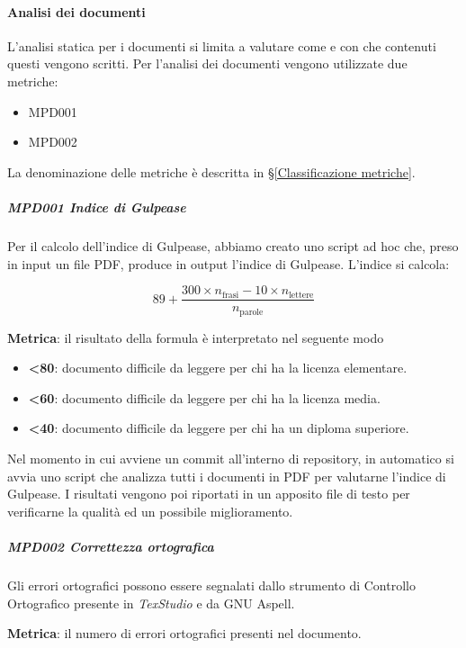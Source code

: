 			\paragraph{Analisi dei documenti}\label{ProcessiSupportoMetriche}
			L'analisi statica per i documenti si limita a valutare come e con che contenuti questi vengono scritti.
			Per l'analisi dei documenti vengono utilizzate due metriche:

			\begin{itemize}
				\item MPD001
				\item MPD002
			\end{itemize}
			
			La denominazione delle metriche è descritta in \S\ref{Classificazione metriche}.

			\subparagraph{MPD001 Indice di Gulpease}\label{AnalisiStatica:Gulpease}
			Per il calcolo dell'indice di Gulpease, abbiamo creato uno script ad hoc che, preso in input un file PDF, produce in output l'indice di Gulpease.
			L'indice si calcola:

			\[89+\dfrac{300\times n_{\text{frasi}}-10\times n_{\text{lettere}}}{n_{\text{parole}}}\]
			
			\textbf{Metrica}: il risultato della formula è interpretato nel seguente modo

			\begin{itemize}
				\item \textbf{<80}: documento  difficile da leggere per chi ha la licenza elementare.
				\item \textbf{<60}: documento  difficile da leggere per chi ha la licenza media.
				\item \textbf{<40}: documento difficile da leggere per chi ha un diploma superiore.
			\end{itemize}

			Nel momento in cui avviene un commit all'interno di repository, in automatico si avvia uno script che analizza tutti i documenti in PDF per valutarne
			l'indice di Gulpease. I risultati vengono poi riportati in un apposito file di testo per verificarne la qualità ed un possibile miglioramento.

			\subparagraph{MPD002 Correttezza ortografica}\label{AnalisiStatica:CorrettezzaOrtografica}
			Gli errori ortografici possono essere segnalati dallo strumento di Controllo Ortografico presente in \textit{TexStudio} e da GNU Aspell.

			\textbf{Metrica}: il numero di errori ortografici presenti nel documento.


